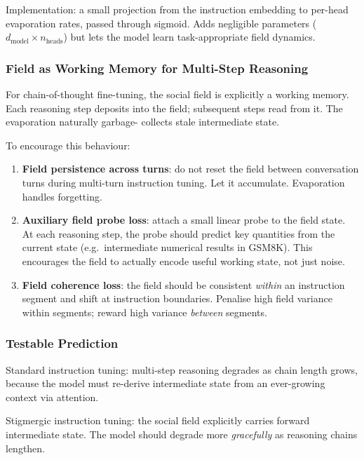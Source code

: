 \documentclass[11pt,a4paper]{article}
\begin{document}
Implementation: a small projection from the instruction embedding to
per-head evaporation rates, passed through sigmoid.  Adds negligible
parameters ($d_{\text{model}} \times n_{\text{heads}}$) but lets the
model learn task-appropriate field dynamics.

\subsubsection{Field as Working Memory for Multi-Step Reasoning}

For chain-of-thought fine-tuning, the social field is explicitly a
working memory.  Each reasoning step deposits into the field;
subsequent steps read from it.  The evaporation naturally garbage-
collects stale intermediate state.

To encourage this behaviour:
\begin{enumerate}
    \item \textbf{Field persistence across turns}: do not reset the
          field between conversation turns during multi-turn
          instruction tuning.  Let it accumulate.  Evaporation handles
          forgetting.
    \item \textbf{Auxiliary field probe loss}: attach a small linear
          probe to the field state.  At each reasoning step, the probe
          should predict key quantities from the current state
          (e.g.\ intermediate numerical results in GSM8K).  This
          encourages the field to actually encode useful working state,
          not just noise.
    \item \textbf{Field coherence loss}: the field should be
          consistent \emph{within} an instruction segment and shift at
          instruction boundaries.  Penalise high field variance within
          segments; reward high variance \emph{between} segments.
\end{enumerate}

\subsubsection{Testable Prediction}

Standard instruction tuning: multi-step reasoning degrades as chain
length grows, because the model must re-derive intermediate state from
an ever-growing context via attention.

Stigmergic instruction tuning: the social field explicitly carries
forward intermediate state.  The model should degrade more
\emph{gracefully} as reasoning chains lengthen.
\end{document}
